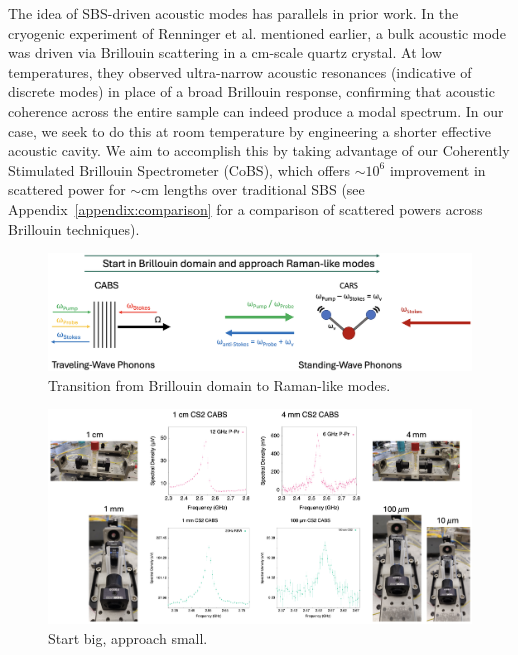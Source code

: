 The idea of \ac{SBS}-driven acoustic modes has parallels in prior work. In the cryogenic experiment of Renninger et al. mentioned earlier, \cite{renninger2018bulk} a bulk acoustic mode was driven via Brillouin scattering in a \si{\centi\meter}-scale quartz crystal. At low temperatures, they observed ultra-narrow acoustic resonances (indicative of discrete modes) in place of a broad Brillouin response, confirming that acoustic coherence across the entire sample can indeed produce a modal spectrum. In our case, we seek to do this at room temperature by engineering a shorter effective acoustic cavity. We aim to accomplish this by taking advantage of our Coherently Stimulated Brillouin Spectrometer (\ac{CoBS}), which offers \(\sim 10^6\) improvement in scattered power for \(\sim\)\si{\centi\meter} lengths over traditional \ac{SBS} (see Appendix~\ref{appendix:comparison} for a comparison of scattered powers across Brillouin techniques).

\begin{figure}[t]
  \centering
  \includegraphics[width=\textwidth]{figs/4-Raman/ExploreBrillouinRamanTransition.png}
  \caption{Transition from Brillouin domain to Raman-like modes.}
  \label{fig:Raman:BrillouinRamanTransition}
\end{figure}

\begin{figure}[t]
  \centering
  \includegraphics[width=\textwidth]{figs/4-Raman/StartBigApproachSmall.png}
  \caption{Start big, approach small.}
  \label{fig:StartBigApproachSmall}
\end{figure}

